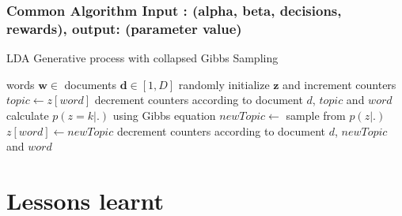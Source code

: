 \subsubsection{Common Algorithm Input : (alpha, beta, decisions, rewards), output: (parameter value)}
\label{appendixAlgo}
\begin{algorithm}[H]
\caption{LDA Generative process with collapsed Gibbs Sampling }
\label{generativeLDA_algorithm}
\renewcommand{\algorithmicrequire}{\textbf{Input:}}
\renewcommand{\algorithmicensure}{\textbf{Output:}}
\begin{algorithmic}[1]
		\REQUIRE words $\bm{w} \in $ documents $\bm{d} \in [1,D]$
			\STATE randomly initialize $\bm{z}$ and increment counters
					\STATE $topic \leftarrow z[word]$
					\STATE decrement counters according to document $d$, $topic$ and $word$
						\STATE calculate $p(z=k|.) $ using Gibbs equation
					\ENDFOR
					\STATE $newTopic \leftarrow $ sample from $p(z|.)$
					\STATE $z[word] \leftarrow newTopic$
					\STATE decrement counters according to document $d$, $newTopic$ and $word$
				\ENDFOR
			\ENDFOR
		\ENDFOR
\end{algorithmic}
\end{algorithm}
	


\section{Lessons learnt}